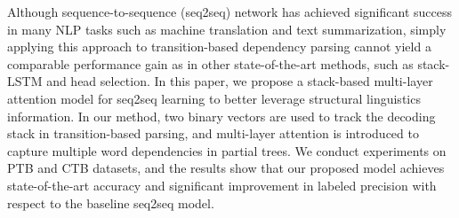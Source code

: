 Although sequence-to-sequence (seq2seq) network has achieved significant success in many NLP tasks such as machine translation and text summarization, simply applying this approach to transition-based dependency parsing cannot yield a comparable performance gain as in other state-of-the-art methods, such as stack-LSTM and head selection. In this paper, we propose a stack-based multi-layer attention model for seq2seq learning to better leverage structural linguistics information. In our method, two binary vectors are used to track the decoding stack in transition-based parsing, and multi-layer attention is introduced to capture multiple word dependencies in partial trees. We conduct experiments on PTB and CTB datasets, and the results show that our proposed model achieves state-of-the-art accuracy and significant improvement in labeled precision with respect to the baseline seq2seq model.
